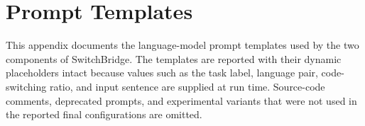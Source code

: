 %
%   
%
%
%
%

\chapter{Prompt Templates}
\label{app:prompts}

This appendix documents the language-model prompt templates used by the two
components of SwitchBridge. The templates are reported with their dynamic
placeholders intact because values such as the task label, language pair,
code-switching ratio, and input sentence are supplied at run time. Source-code
comments, deprecated prompts, and experimental variants that were not used in
the reported final configurations are omitted.

